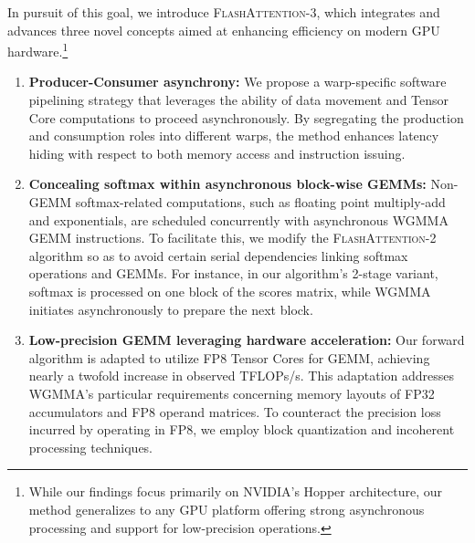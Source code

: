 In pursuit of this goal, we introduce \textsc{FlashAttention-3}, which integrates and advances three novel concepts aimed at enhancing efficiency on modern GPU hardware.\footnote{While our findings focus primarily on NVIDIA's Hopper architecture, our method generalizes to any GPU platform offering strong asynchronous processing and support for low-precision operations.}

\begin{enumerate}

\item \textbf{Producer-Consumer asynchrony:} We propose a warp-specific software pipelining strategy that leverages the ability of data movement and Tensor Core computations to proceed asynchronously. By segregating the production and consumption roles into different warps, the method enhances latency hiding with respect to both memory access and instruction issuing.
\item \textbf{Concealing softmax within asynchronous block-wise GEMMs:} Non-GEMM softmax-related computations, such as floating point multiply-add and exponentials, are scheduled concurrently with asynchronous WGMMA GEMM instructions. To facilitate this, we modify the \textsc{FlashAttention-2} algorithm so as to avoid certain serial dependencies linking softmax operations and GEMMs. For instance, in our algorithm’s 2-stage variant, softmax is processed on one block of the scores matrix, while WGMMA initiates asynchronously to prepare the next block.
\item \textbf{Low-precision GEMM leveraging hardware acceleration:} Our forward algorithm is adapted to utilize FP8 Tensor Cores for GEMM, achieving nearly a twofold increase in observed TFLOPs/s. This adaptation addresses WGMMA’s particular requirements concerning memory layouts of FP32 accumulators and FP8 operand matrices. To counteract the precision loss incurred by operating in FP8, we employ block quantization and incoherent processing techniques.
\end{enumerate}

